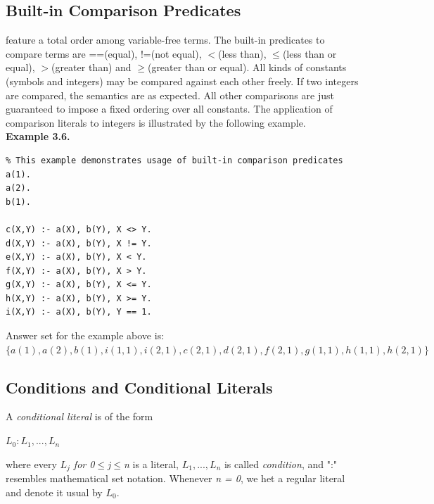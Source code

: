 \documentclass[14pt,a4paper, titlepage]{article}
\begin{document}
\subsection{Built-in Comparison Predicates}
\dlvhex{} feature a total order among variable-free terms. The built-in predicates to compare terms are ==(equal), !=(not equal), $<$(less than), $\leq$(less than or equal), $>$(greater than) and $\geq$(greater than or equal). All kinds of constants (symbols and integers) may be compared against each other freely. If two integers are compared, the semantics are as expected. All other comparisons are just guaranteed to impose a fixed ordering over all constants. The application of comparison literals to integers is illustrated by the following example.
\\ \textbf{Example 3.6.}
\begin{lstlisting}
% This example demonstrates usage of built-in comparison predicates
a(1).
a(2).
b(1).

c(X,Y) :- a(X), b(Y), X <> Y.
d(X,Y) :- a(X), b(Y), X != Y.
e(X,Y) :- a(X), b(Y), X < Y.
f(X,Y) :- a(X), b(Y), X > Y.
g(X,Y) :- a(X), b(Y), X <= Y.
h(X,Y) :- a(X), b(Y), X >= Y.
i(X,Y) :- a(X), b(Y), Y == 1.
\end{lstlisting}
Answer set for the example above is:\\$\{a(1),a(2),b(1),i(1,1),i(2,1),c(2,1),d(2,1),f(2,1),g(1,1),h(1,1),h(2,1)\}$
\subsection{Conditions and Conditional Literals}
A \textit{conditional literal} is of the form \\ \centerline{$L_0:L_1,...,L_n$} where every \textit{$L_j$ for 0$\leq$j$\leq$n} is a literal, $L_1,...,L_n$ is called \textit{condition}, and ":" resembles mathematical set notation. Whenever \textit{n = 0}, we het a regular literal and denote it usual by $L_0$.
\end{document}
